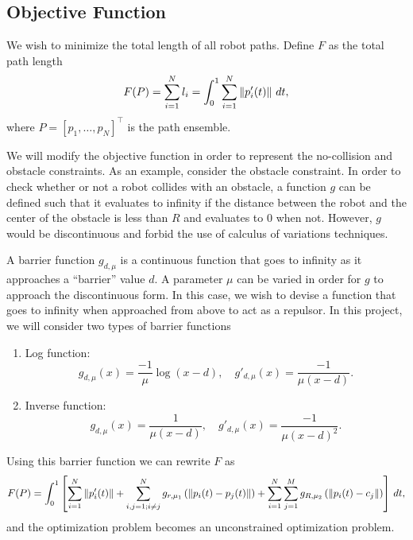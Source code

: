 \documentclass[11pt]{article}
\begin{document}
\subsection{Objective Function}

We wish to minimize the total length of all robot paths. Define \(F\) as the total path length
\begin{equation}
	F(P) = \sum_{i=1}^{N} l_i = \int_0^1 \sum_{i=1}^{N} \left\lVert p_i'(t) \right\rVert \,dt,
\end{equation}
where \(P = [p_1, \ldots, p_N]^\intercal\) is the path ensemble.

We will modify the objective function in order to represent the no-collision and obstacle constraints. As an example, consider the obstacle constraint. In order to check whether or not a robot collides with an obstacle, a function \(g\) can be defined such that it evaluates to infinity if the distance between the robot and the center of the obstacle is less than \(R\) and evaluates to 0 when not. However, \(g\) would be discontinuous and forbid the use of calculus of variations techniques.

A barrier function \(g_{d,\mu}\) is a continuous function that goes to infinity as it approaches a ``barrier'' value \(d\). A parameter \(\mu\) can be varied in order for \(g\) to approach the discontinuous form. In this case, we wish to devise a function that goes to infinity when approached from above to act as a repulsor. In this project, we will consider two types of barrier functions
\begin{enumerate}
	\item Log function:
	\begin{equation}
		g_{d,\mu}(x) = \frac{-1}{\mu} \log(x-d),
		\quad
		g'_{d,\mu}(x) = \frac{-1}{\mu(x-d)}.
	\end{equation}
	\item Inverse function:
	\begin{equation}
		g_{d,\mu}(x) = \frac{1}{\mu(x-d)},
		\quad
		g'_{d,\mu}(x) = \frac{-1}{\mu(x-d)^2}.
	\end{equation}
\end{enumerate}

Using this barrier function we can rewrite \(F\) as
\begin{equation}
	F(P) = \int_0^1 \left[ \sum_{i=1}^{N} \left\lVert p'_i(t) \right\rVert + \sum_{i,j = 1; i \neq j}^{N} g_{r,\mu_1}\left( \left\lVert p_i(t) - p_j(t) \right\rVert \right) + \sum_{i=1}^{N} \sum_{j=1}^{M} g_{R,\mu_2}\left( \left\lVert p_i(t) - c_j \right\rVert \right) \right] \,dt,
\end{equation}
and the optimization problem becomes an unconstrained optimization problem.
\end{document}

